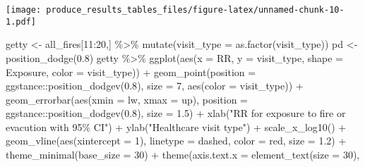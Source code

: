 \documentclass[
]{article}
\newenvironment{Shaded}{\begin{snugshade}}{\end{snugshade}}
\newcommand{\AttributeTok}[1]{\textcolor[rgb]{0.77,0.63,0.00}{#1}}
\newcommand{\DecValTok}[1]{\textcolor[rgb]{0.00,0.00,0.81}{#1}}
\newcommand{\FloatTok}[1]{\textcolor[rgb]{0.00,0.00,0.81}{#1}}
\newcommand{\FunctionTok}[1]{\textcolor[rgb]{0.00,0.00,0.00}{#1}}
\newcommand{\NormalTok}[1]{#1}
\newcommand{\OtherTok}[1]{\textcolor[rgb]{0.56,0.35,0.01}{#1}}
\newcommand{\SpecialCharTok}[1]{\textcolor[rgb]{0.00,0.00,0.00}{#1}}
\newcommand{\StringTok}[1]{\textcolor[rgb]{0.31,0.60,0.02}{#1}}
\begin{document}
\texttt{[image: produce\_results\_tables\_files/figure-latex/unnamed-chunk-10-1.pdf]}

\begin{Shaded}
\begin{Highlighting}[]
\NormalTok{getty }\OtherTok{\textless{}{-}}\NormalTok{ all\_fires[}\DecValTok{11}\SpecialCharTok{:}\DecValTok{20}\NormalTok{,] }\SpecialCharTok{\%\textgreater{}\%} \FunctionTok{mutate}\NormalTok{(}\AttributeTok{visit\_type =} \FunctionTok{as.factor}\NormalTok{(visit\_type))}
\NormalTok{pd }\OtherTok{\textless{}{-}} \FunctionTok{position\_dodge}\NormalTok{(}\FloatTok{0.8}\NormalTok{)}
\NormalTok{getty }\SpecialCharTok{\%\textgreater{}\%} \FunctionTok{ggplot}\NormalTok{(}\FunctionTok{aes}\NormalTok{(}\AttributeTok{x =}\NormalTok{ RR, }\AttributeTok{y =}\NormalTok{ visit\_type, }
                       \AttributeTok{shape =}\NormalTok{ Exposure, }\AttributeTok{color =}\NormalTok{ visit\_type)) }\SpecialCharTok{+} 
  \FunctionTok{geom\_point}\NormalTok{(}\AttributeTok{position =}\NormalTok{ ggstance}\SpecialCharTok{::}\FunctionTok{position\_dodgev}\NormalTok{(}\FloatTok{0.8}\NormalTok{), }\AttributeTok{size =} \DecValTok{7}\NormalTok{, }\FunctionTok{aes}\NormalTok{(}\AttributeTok{color =}\NormalTok{ visit\_type)) }\SpecialCharTok{+}
  \FunctionTok{geom\_errorbar}\NormalTok{(}\FunctionTok{aes}\NormalTok{(}\AttributeTok{xmin =}\NormalTok{ lw, }\AttributeTok{xmax =}\NormalTok{ up), }\AttributeTok{position =}\NormalTok{ ggstance}\SpecialCharTok{::}\FunctionTok{position\_dodgev}\NormalTok{(}\FloatTok{0.8}\NormalTok{),}
                \AttributeTok{size =} \FloatTok{1.5}\NormalTok{) }\SpecialCharTok{+} 
  \FunctionTok{xlab}\NormalTok{(}\StringTok{"RR for exposure to fire or evacution with 95\% CI"}\NormalTok{) }\SpecialCharTok{+} 
  \FunctionTok{ylab}\NormalTok{(}\StringTok{"Healthcare visit type"}\NormalTok{) }\SpecialCharTok{+}
   \FunctionTok{scale\_x\_log10}\NormalTok{() }\SpecialCharTok{+}
  \FunctionTok{geom\_vline}\NormalTok{(}\FunctionTok{aes}\NormalTok{(}\AttributeTok{xintercept =} \DecValTok{1}\NormalTok{), }\AttributeTok{linetype =} \StringTok{\textquotesingle{}dashed\textquotesingle{}}\NormalTok{, }\AttributeTok{color =} \StringTok{\textquotesingle{}red\textquotesingle{}}\NormalTok{, }\AttributeTok{size =} \FloatTok{1.2}\NormalTok{) }\SpecialCharTok{+}
  \FunctionTok{theme\_minimal}\NormalTok{(}\AttributeTok{base\_size =} \DecValTok{30}\NormalTok{) }\SpecialCharTok{+}
  \FunctionTok{theme}\NormalTok{(}\AttributeTok{axis.text.x =} \FunctionTok{element\_text}\NormalTok{(}\AttributeTok{size =} \DecValTok{30}\NormalTok{),}

\end{Highlighting}
\end{Shaded}
\end{document}
